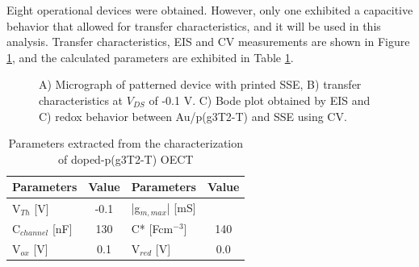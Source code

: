 Eight operational devices were obtained. However, only one exhibited a capacitive behavior that allowed for transfer characteristics, and it will be used in this analysis. Transfer characteristics, EIS and CV measurements are shown in Figure \ref{fig:dopedSSE}, and the calculated parameters are exhibited in Table \ref{tab:dopedfom}.

\begin{figure}[ht]
    \centering
    \qquad
    \caption[Performance of solid-OECT with doped-p(g3T2-T)]{A) Micrograph of patterned device with printed SSE, B) transfer characteristics at $V_{DS}$ of -0.1 V. C) Bode plot obtained by EIS and C) redox behavior between Au/p(g3T2-T) and SSE using CV.}
    \label{fig:dopedSSE}
\end{figure}

\begin{table}[ht]
\centering
\caption{Parameters extracted from the characterization of doped-p(g3T2-T) OECT}
\begin{tabular}{l|c||l|c}
Parameters & Value & Parameters & Value \\\hline \hline
V$_{Th}$ [V] & -0.1 & |g$_{m,max}$| [mS] & \\
C$_{channel}$ [nF] & 130 & C* [Fcm$^{-3}$] &  140 \\
V$_{ox}$ [V] & 0.1 & V$_{red}$ [V] & 0.0 \\\hline
\end{tabular}
\label{tab:dopedfom}
\end{table}

